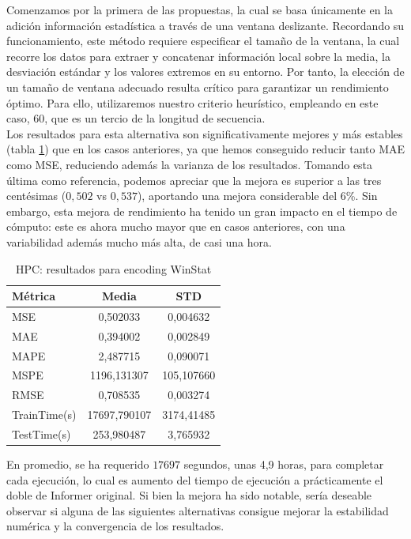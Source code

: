 Comenzamos por la primera de las propuestas, la cual se basa únicamente en la adición información estadística a través de una ventana deslizante. Recordando su funcionamiento, este método requiere especificar el tamaño de la ventana, la cual recorre los datos para extraer y concatenar información local sobre la media, la desviación estándar y los valores extremos en su entorno. Por tanto, la elección de un tamaño de ventana adecuado resulta crítico para garantizar un rendimiento óptimo. Para ello, utilizaremos nuestro criterio heurístico, empleando en este caso, 60, que es un tercio de la longitud de secuencia.\\

Los resultados para esta alternativa son significativamente mejores y más estables (tabla \ref{hpcwin}) que en los casos anteriores, ya que hemos conseguido reducir tanto MAE como MSE, reduciendo además la varianza de los resultados. Tomando esta última como referencia, podemos apreciar que la mejora es superior a las tres centésimas ($0,502$ vs $0,537$), aportando una mejora considerable del 6\%. Sin embargo, esta mejora de rendimiento ha tenido un gran impacto en el tiempo de cómputo: este es ahora mucho mayor que en casos anteriores, con una variabilidad además mucho más alta, de casi una hora.\\

\begin{table}[!ht]
	\centering
	\begin{tabular}{l|c|c}
		\toprule
		Métrica & Media & STD \\
		\midrule
		MSE & 0,502033 & 0,004632 \\
		MAE & 0,394002 & 0,002849 \\
		MAPE & 2,487715 & 0,090071 \\
		MSPE & 1196,131307 & 105,107660 \\
		RMSE & 0,708535 & 0,003274 \\
		TrainTime(s) & 17697,790107 & 3174,41485 \\
		TestTime(s) & 253,980487 & 3,765932 \\
		\bottomrule
	\end{tabular}
	\caption{HPC: resultados para encoding WinStat}
	\label{hpcwin}
\end{table}

En promedio, se ha requerido $17697$ segundos, unas 4,9 horas, para completar cada ejecución, lo cual es aumento del tiempo de ejecución a prácticamente el doble de Informer original. Si bien la mejora ha sido notable, sería deseable observar si alguna de las siguientes alternativas consigue mejorar la estabilidad numérica y la convergencia de los resultados.

